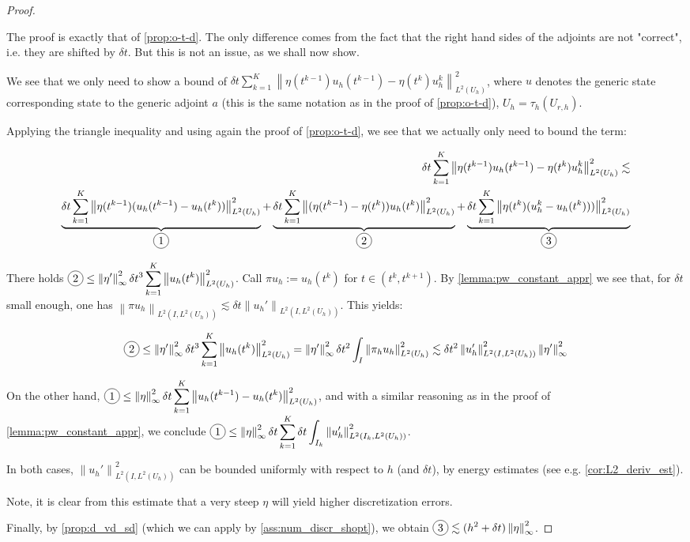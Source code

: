 \documentclass[english,a4paper,9pt,oneside]{scrbook}	%
\theoremstyle{break}
\newenvironment{mproof}[1][\proofname]{%
  \begin{proof}[#1]$ $\par\nobreak\ignorespaces
}{%
  \end{proof}
}
\renewcommand*{\proofname}{Proof}
\theoremstyle{remark}
\newcommand{\ds}{\displaystyle}
\newcommand{\norm}[1]{\left\lVert#1\right\rVert}
\newcommand*\circled[1]{\tikz[baseline=(char.base)]{
            \node[shape=circle,draw,inner sep=2pt] (char) {#1};}}
\begin{document}
\begin{mproof}
The proof is exactly that of \cref{prop:o-t-d}. The only difference comes from the fact that the right hand sides of the adjoints are not "correct", i.e. they are shifted by $\delta t$. But this is not an issue, as we shall now show. 

We see that we only need to show a bound of  $\delta t \sum_{k=1}^{K}\norm{\eta(t^{k-1})u_h(t^{k-1})-\eta(t^k)u_h^{k}}^2_{L^2(U_h)}$, where $u$ denotes the generic state corresponding state to the generic adjoint $a$ (this is the same notation as in the proof of \cref{prop:o-t-d}), $U_h=\tau_h(U_{r,h})$.

Applying the triangle inequality and using again the proof of \cref{prop:o-t-d}, we see that we actually only need to bound the term:

\begin{align*}
\delta t \sum_{k=1}^{K}\norm{\eta(t^{k-1})u_h(t^{k-1})-\eta(t^k)u_h^k}^2_{L^2(U_h)}\lesssim\\
\underbrace{\delta t \sum_{k=1}^{K}\norm{\eta(t^{k-1})(u_h(t^{k-1})-u_h(t^{k}))}^2_{L^2(U_h)}}_{\circled{1}}+
\underbrace{\delta t \sum_{k=1}^{K}\norm{(\eta(t^{k-1})-\eta(t^k))u_h(t^{k})}^2_{L^2(U_h)}}_{\circled{2}}+
\underbrace{\delta t \sum_{k=1}^{K}\norm{\eta(t^k)(u_h^k-u_h(t^k)))}^2_{L^2(U_h)}}_{\circled{3}}
\end{align*}

There holds $\ds  \circled{2} \leq \norm{\eta'}_\infty^2 \delta t^3 \sum_{k=1}^{K}\norm{u_h(t^{k})}^2_{L^2(U_h)}$. Call $\pi u_h := u_h(t^{k})$ for $t \in (t^k, t^{k+1})$. By \cref{lemma:pw_constant_appr} we see that, for $\delta t $ small enough, one has $\norm{\pi u_h}_{L^2(I, L^2(U_h))} \lesssim \delta t \norm{u_h'}_{L^2(I,L^2(U_h))}$. This yields:

\begin{align*}
	 \ds  \circled{2}\leq \norm{\eta'}_\infty^2 \delta t^3 \sum_{k=1}^{K}\norm{u_h(t^{k})}^2_{L^2(U_h)}  = \norm{\eta'}_\infty^2 \delta t^2 \int_I \norm{\pi_h u_h}^2_{L^2(U_h)}\lesssim \delta t^2 \norm{u_h'}_{L^2(I,L^2(U_h))}^2 \norm{\eta'}_\infty ^2
\end{align*}

On the other hand,  $\ds  \circled{1} \leq \norm{\eta}_\infty^2 \delta t \sum_{k=1}^{K}\norm{u_h(t^{k-1})-u_h(t^{k})}^2_{L^2(U_h)}$, and with a similar reasoning as in the proof of \cref{lemma:pw_constant_appr}, we conclude $\ds \circled{1} \leq \norm{\eta}_\infty^2 \delta t \sum_{k=1}^{K} \delta t \int_{I_k}\norm{u_h'}_{L^2(I_k , L^2(U_h))}^2$.

In both cases, $\norm{u_h'}_{L^2(I,L^2(U_h))}^2$ can be bounded uniformly with respect to $h$ (and $\delta t$), by energy estimates (see e.g. \cref{cor:L2_deriv_est}).

Note, it is clear from this estimate that a very steep $\eta$ will yield higher discretization errors.

Finally, by \cref{prop:d_vd_sd} (which we can apply by \cref{ass:num_discr_shopt}), we obtain $\ds \circled{3} \lesssim (h^2+\delta t)\norm{\eta}_\infty^2 $.

\end{mproof}
\end{document}
